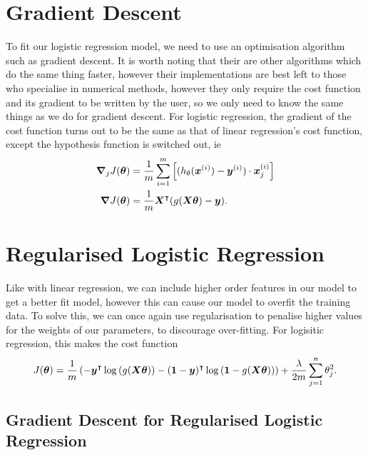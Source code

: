 \section{Gradient Descent}
To fit our logistic regression model, we need to use an optimisation algorithm such as gradient descent. It is worth noting that their are other algorithms which do
the same thing faster, however their implementations are best left to those who specialise in numerical methods, however they only require the cost function and its
gradient to be written by the user, so we only need to know the same things as we do for gradient descent. For logistic regression, the gradient of the cost function
turns out to be the same as that of linear regression's cost function, except the hypothesis function is switched out, ie
\begin{align}
    \bm{\nabla}_j J(\bm{\theta}) &= \frac{1}{m} \sum_{i=1}^{m}\left[(h_{\theta}(\bm{x}^{(i)})-\bm{y}^{(i)})\cdot\bm{x}^{(i)}_j\right] \\
    \bm{\nabla} J(\bm{\theta}) &= \frac{1}{m} \bm{X}^{\intercal}(g(\bm{X\theta}) - \bm{y}).
\end{align}

\section{Regularised Logistic Regression}
Like with linear regression, we can include higher order features in our model to get a better fit model, however this can cause our model to overfit the training data. To
solve this, we can once again use regularisation to penalise higher values for the weights of our parameters, to discourage over-fitting. For logisitic regression, this makes
the cost function
\begin{equation}
    J(\bm{\theta}) = \frac{1}{m} \left(-\bm{y}^{\intercal}\log{\left(g(\bm{X\theta})\right)} - (\bm{1} - \bm{y})^{\intercal}\log{\left(\bm{1} - g(\bm{X\theta})\right)}\right)
        + \frac{\lambda}{2m} \sum_{j=1}^{n} \theta_j^2.
\end{equation}

\subsection{Gradient Descent for Regularised Logistic Regression}

